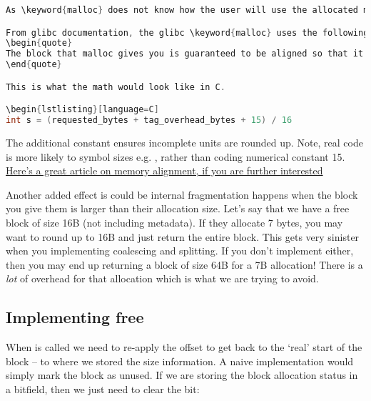 \begin{lstlisting}[language=C]
As \keyword{malloc} does not know how the user will use the allocated memory, the pointer returned to the program needs to be aligned for the worst case, which is architecture dependent.

From glibc documentation, the glibc \keyword{malloc} uses the following heuristic \cite{vma_paging}
\begin{quote}
The block that malloc gives you is guaranteed to be aligned so that it can hold any type of data. On GNU systems, the address is always a multiple of eight on most systems, and a multiple of 16 on 64-bit systems." For example, if you need to calculate how many 16 byte units are required, don't forget to round up.
\end{quote}

This is what the math would look like in C.

\begin{lstlisting}[language=C]
int s = (requested_bytes + tag_overhead_bytes + 15) / 16
\end{lstlisting}

The additional constant ensures incomplete units are rounded up. Note, real code is more likely to symbol sizes e.g. , rather than coding numerical constant 15.
\href{http://www.ibm.com/developerworks/library/pa-dalign/}{Here's a great article on memory alignment, if you are further interested}

Another added effect is could be internal fragmentation happens when the block you give them is larger than their allocation size.
Let's say that we have a free block of size 16B (not including metadata).
If they allocate 7 bytes, you may want to round up to 16B and just return the entire block.
This gets very sinister when you implementing coalescing and splitting.
If you don't implement either, then you may end up returning a block of size 64B for a 7B allocation!
There is a \emph{lot} of overhead for that allocation which is what we are trying to avoid.

\subsection{Implementing free}

When  is called we need to re-apply the offset to get back to the `real' start of the block -- to where we stored the size information.
A naive implementation would simply mark the block as unused.
If we are storing the block allocation status in a bitfield, then we just need to clear the bit:

